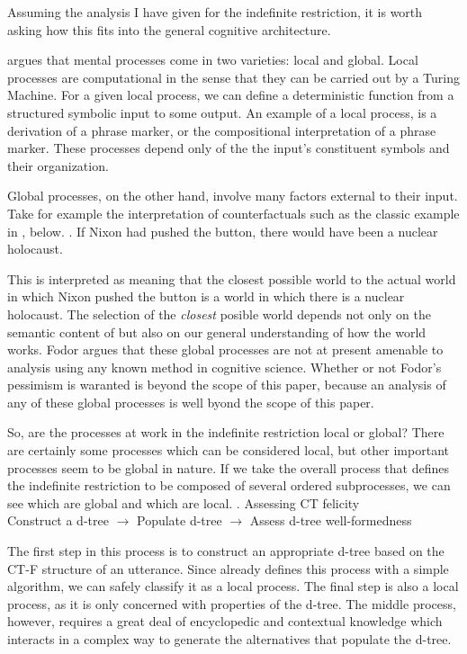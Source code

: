 \documentclass[GPFinal]{subfiles}
\begin{document}
Assuming the analysis I have given for the indefinite restriction, it is worth asking how this fits into the general cognitive architecture.

\textcite{fodor2001mind} argues that mental processes come in two varieties: local and global.
Local processes are computational in the sense that they can be carried out by a Turing Machine.
For a given local process, we can define a deterministic function from a structured symbolic input to some output.
An example of a local process, is a derivation of a phrase marker, or the compositional interpretation of a phrase marker.
These processes depend only of the the input's constituent symbols and their organization.

Global processes, on the other hand, involve many factors external to their input.
Take for example the interpretation of counterfactuals such as the classic example in \Next, below.
\ex. If Nixon had pushed the button, there would have been a nuclear holocaust.\hfill <++>

This is interpreted as meaning that the closest possible world to the actual world in which Nixon pushed the button is a world in which there is a nuclear holocaust.
The selection of the \textit{closest} posible world depends not only on the semantic content of \Last but also on our general understanding of how the world works.
Fodor argues that these global processes are not at present amenable to analysis using any known method in cognitive science.
Whether or not Fodor's pessimism is waranted is beyond the scope of this paper, because an analysis of any of these global processes is well byond the scope of this paper.

So, are the processes at work in the indefinite restriction local or global?
There are certainly some processes which can be considered local, but other important processes seem to be global in nature.
If we take the overall process that defines the indefinite restriction to be composed of several ordered subprocesses, we can see which are global and which are local.
\ex. Assessing CT felicity\\
Construct a d-tree $\rightarrow$ Populate d-tree $\rightarrow$ Assess d-tree well-formedness

The first step in this process is to construct an appropriate d-tree based on the CT-F structure of an utterance.
Since \textcite{buring2003d} already defines this process with a simple algorithm, we can safely classify it as a local process.
The final step is also a local process, as it is only concerned with properties of the d-tree.
The middle process, however, requires a great deal of encyclopedic and contextual knowledge which interacts in a complex way to generate the alternatives that populate the d-tree.
\end{document}

